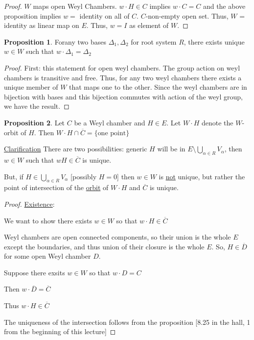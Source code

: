 \documentclass{article}
\theoremstyle{definition}
\newtheorem{proposition}{Proposition}
\begin{document}
\begin{proof}
    \(W\) maps open Weyl Chambers. \(w\cdot H\in C\) implies \(w\cdot C = C\) and the above proposition implies \(w =\) identity on all of \(C\). \(C\)-non-empty open set. Thus, \(W\) = identity as linear map on \(E\). Thus, \(w = I\) as element of \(W\). 
\end{proof}

\begin{proposition}
    Forany two bases \(\Delta _1, \Delta _2\) for root system \(R\), there exists unique \(w\in W\) such that \(w\cdot \Delta_1 = \Delta _2\) 
\end{proposition}

\begin{proof}
    First: this statement for open weyl chambers. The group action on weyl chambers is transitive and free. Thus, for any two weyl chambers there exists a unique member of \(W\) that maps one to the other. Since the weyl chambers are in bijection with bases and this bijection commutes with action of the weyl group, we have the result.
\end{proof}

\begin{proposition}
    Let \(C\) be a Weyl chamber and \(H\in E\). Let \(W\cdot H\) denote the \(W\)-orbit of \(H\). Then \(W\cdot H \cap \overline{C} = \{ \text{one point}  \} \) 
\end{proposition}

\underline{Clarification} There are two possibilities: generic \(H\) will be in \(E \setminus \bigcup_{\alpha \in R}^{} V_\alpha\), then \(w\in W\) such that \(wH\in \overline{C} \) is unique.

But, if \(H\in \bigcup_{\alpha \in R}^{} V_\alpha\) [possibly \(H = 0\)] then \(w\in W\) is \underline{not} unique, but rather the point of intersection of the \underline{orbit} of \(W\cdot H\) and \(\overline{C} \) is unique.

\begin{proof}
    \underline{Existence}:

    We want to show there exists \(w\in W\) so that \(w\cdot H\in \overline{C}\) 

    Weyl chambers are open connected components, so their union is the whole \(E\) except the boundaries, and thus union of their closure is the whole \(E\). So, \(H\in \overline{D} \) for some open Weyl chamber \(D\).

    Suppose there exsits \(w\in W\) so that \(w\cdot D = C\) 

    Then \(w\cdot \overline{D} = \overline{C}\)
    
    Thus \(w\cdot H \in \overline{C}\) 

    The uniqueness of the intersection follows from the proposition [8.25 in the hall, 1 from the beginning of this lecture]

\end{proof}
\end{document}
